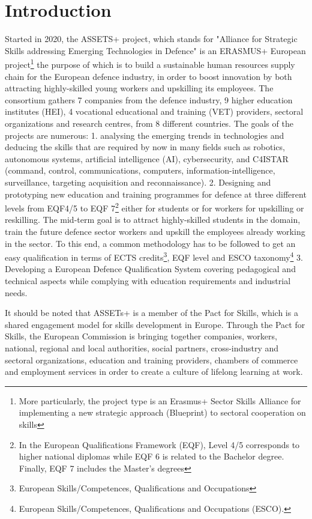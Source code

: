 \documentclass{article}
\begin{document}
\section{Introduction}
 Started in 2020, the ASSETS+ project, which stands for "Alliance for Strategic Skills addressing Emerging Technologies in Defence"  is an ERASMUS+ European project\footnote{More particularly, the project type is an Erasmus+ Sector Skills Alliance for implementing a new strategic approach (Blueprint) to sectoral cooperation on skills} the purpose of which is to build a sustainable human resources supply chain for the European defence industry, in order to boost innovation by both attracting highly-skilled young workers and upskilling its employees.  The consortium gathers 7 companies from the defence industry, 9 higher education institutes (HEI), 4 vocational educational and training (VET) providers, sectoral organizations and research centres, from 8 different countries. The goals of the projects are numerous:
1. analysing the emerging trends in technologies and deducing the skills that are required by now in many fields such as robotics, autonomous systems, artificial intelligence (AI), cybersecurity, and C4ISTAR (command, control, communications, computers, information-intelligence, surveillance, targeting acquisition and reconnaissance). 2. Designing and prototyping new education and training programmes for defence at three different levels from EQF4/5 to EQF 7\footnote{In the European Qualifications Framework (EQF), Level 4/5 corresponds to higher national diplomas while EQF 6 is related to the Bachelor degree. Finally, EQF 7 includes the Master’s degrees} either for students or for workers for upskilling or reskilling. The mid-term goal is to attract highly-skilled students in the domain, train the future defence sector workers and upskill the employees already working in the sector.  To this end, a common methodology has to be followed to get an easy qualification in terms of ECTS credits\footnote{European Skills/Competences, Qualifications and Occupations}, EQF level and ESCO taxonomy\footnote{European Skills/Competences, Qualifications and Occupations (ESCO).}
3. Developing a European Defence Qualification System covering pedagogical and technical aspects while complying with education requirements and industrial needs.

It should be noted that ASSETs+ is a member of the Pact for Skills, which is a shared engagement model for skills development in Europe. Through the Pact for Skills, the European Commission is bringing together companies, workers, national, regional and local authorities, social partners, cross-industry and sectoral organizations, education and training providers, chambers of commerce and employment services in order to create a culture of lifelong learning at work.
\end{document}
